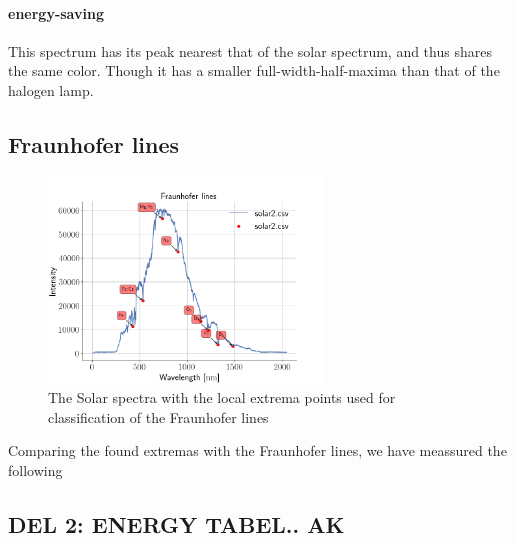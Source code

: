 \paragraph{energy-saving}
This spectrum has its peak nearest that of the solar spectrum, and thus shares
the same color. Though it has a smaller full-width-half-maxima than that of the
halogen lamp.

\subsection{Fraunhofer lines}
\begin{figure}[h]
\centering
\includegraphics[width=0.65\textwidth]{Fraunhofer}
\caption{The Solar spectra with the local extrema points used for
classification of the Fraunhofer lines}
\label{frauenhofer}
\end{figure}

Comparing the found extremas with the Fraunhofer lines, we have meassured the
following

\subsection{DEL 2: ENERGY TABEL.. AK}

